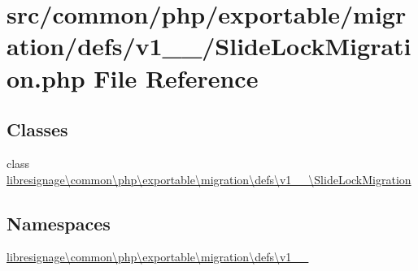\hypertarget{v1__0__0_2SlideLockMigration_8php}{}\section{src/common/php/exportable/migration/defs/v1\+\_\+\_/\+Slide\+Lock\+Migration.php File Reference}
\label{v1__0__0_2SlideLockMigration_8php}
\subsection*{Classes}
\begin{DoxyCompactItemize}
\item 
class \hyperlink{classlibresignage_1_1common_1_1php_1_1exportable_1_1migration_1_1defs_1_1v1__0__0_1_1SlideLockMigration}{libresignage\textbackslash{}common\textbackslash{}php\textbackslash{}exportable\textbackslash{}migration\textbackslash{}defs\textbackslash{}v1\+\_\+\_\textbackslash{}\+Slide\+Lock\+Migration}
\end{DoxyCompactItemize}
\subsection*{Namespaces}
\begin{DoxyCompactItemize}
\item 
 \hyperlink{namespacelibresignage_1_1common_1_1php_1_1exportable_1_1migration_1_1defs_1_1v1__0__0}{libresignage\textbackslash{}common\textbackslash{}php\textbackslash{}exportable\textbackslash{}migration\textbackslash{}defs\textbackslash{}v1\+\_\+\_}
\end{DoxyCompactItemize}
